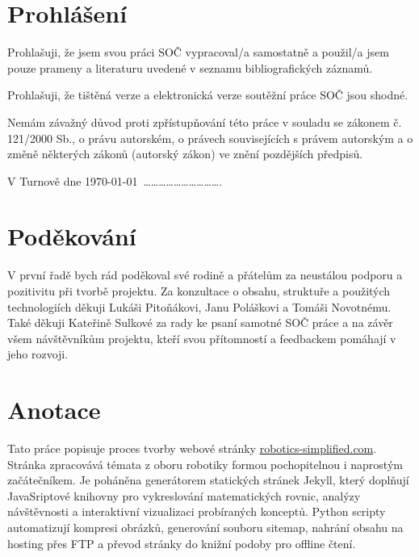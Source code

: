 \documentclass[a4paper, 12pt]{article}
\begin{document}
  \vspace{4em}

  \newpage

  \section*{\normalfont\textbf{Prohlášení}}
  Prohlašuji, že jsem svou práci SOČ vypracoval/a samostatně a použil/a jsem pouze prameny a literaturu uvedené v seznamu bibliografických záznamů.

  Prohlašuji, že tištěná verze a elektronická verze soutěžní práce SOČ jsou shodné.

  Nemám závažný důvod proti zpřístupňování této práce v souladu se zákonem č. 121/2000 Sb., o právu autorském, o právech souvisejících s právem autorským a o změně některých zákonů (autorský zákon) ve znění pozdějších předpisů.

  \qquad

  V Turnově dne \today \, ………………………….\\%

  \newpage

  \section*{\normalfont\textbf{Poděkování}}
  V první řadě bych rád poděkoval své rodině a přátelům za neustálou podporu a pozitivitu při tvorbě projektu. Za konzultace o obsahu, struktuře a použitých technologiích děkuji Lukáši Pitoňákovi, Janu Poláškovi a Tomáši Novotnému. Také děkuji Kateřině Sulkové za rady ke psaní samotné SOČ práce a na závěr všem návštěvníkům projektu, kteří svou přítomností a feedbackem pomáhají v jeho rozvoji.

  \newpage

  \section*{\normalfont\textbf{Anotace}}
  Tato práce popisuje proces tvorby webové stránky \url{robotics-simplified.com}. Stránka zpracovává témata z oboru robotiky formou pochopitelnou i naprostým začátečníkem. Je poháněna generátorem statických stránek Jekyll, který doplňují JavaSriptové knihovny pro vykreslování matematických rovnic, analýzy návštěvnosti a interaktivní vizualizaci probíraných konceptů. Python scripty automatizují kompresi obrázků, generování souboru sitemap, nahrání obsahu na hosting přes FTP a převod stránky do knižní podoby pro offline čtení.
\end{document}
